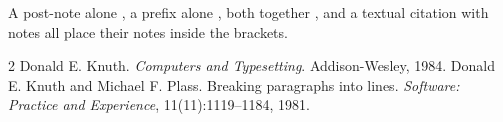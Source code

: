 \documentclass{article}
\begin{document}
A post-note alone \citep[p.~5]{knuth84}, a prefix alone \citep[see][]{plass81},
both together \citep[e.g.][chap.~2]{knuth84,plass81}, and a textual citation
with notes \citet[see][p.~7]{knuth84} all place their notes inside the
brackets.

\begin{thebibliography}{2}
 Donald E. Knuth. \emph{Computers and Typesetting}. Addison-Wesley, 1984.
 Donald E. Knuth and Michael F. Plass.
  Breaking paragraphs into lines. \emph{Software: Practice and Experience},
  11(11):1119--1184, 1981.
\end{thebibliography}
\end{document}
